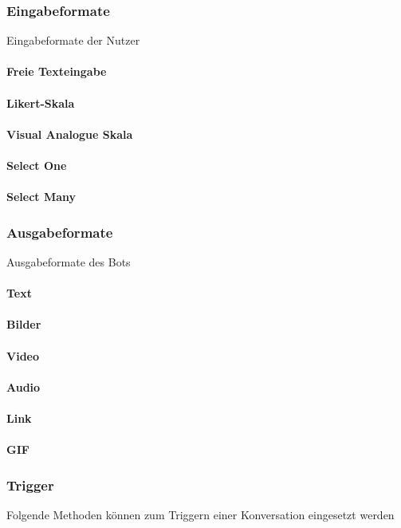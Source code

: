 \subsubsection{Eingabeformate} Eingabeformate der Nutzer	
\paragraph{Freie Texteingabe}
\paragraph{Likert-Skala}
\paragraph{Visual Analogue Skala}
\paragraph{Select One}
\paragraph{Select Many}

\subsubsection{Ausgabeformate} Ausgabeformate des Bots
\paragraph{Text}
\paragraph{Bilder}
\paragraph{Video}
\paragraph{Audio}
\paragraph{Link}
\paragraph{GIF}

\subsubsection{Trigger}Folgende Methoden können zum Triggern einer Konversation eingesetzt werden

